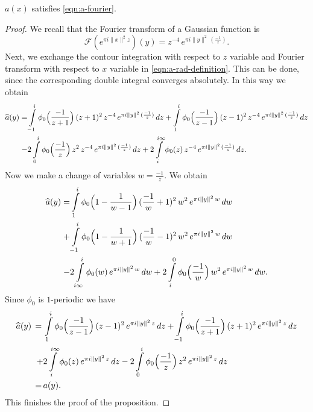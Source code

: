 \begin{proposition}\label{prop:a-fourier}\leanok
$a(x)$ satisfies \eqref{eqn:a-fourier}.
\end{proposition}
\begin{proof}\leanok
We recall that the Fourier transform of a Gaussian function is
\begin{equation}\label{eqn:gaussian Fourier}
    \mathcal{F}(e^{\pi i \|x\|^2 z})(y)=z^{-4}\,e^{\pi i \|y\|^2 \,(\frac{-1}{z}) }.
\end{equation}
Next, we exchange the contour integration with respect to $z$ variable and Fourier transform with respect to $x$ variable in \eqref{eqn:a-rad-definition}.
This can be done, since the corresponding double integral converges absolutely. In this way we obtain
\begin{align}
    \widehat{a}(y)=&\int\limits_{-1}^i\phi_0\Big(\frac{-1}{z+1}\Big)\,(z+1)^2\,z^{-4}\,e^{\pi i \|y\|^2 \,(\frac{-1}{z})}\,dz
    +\int\limits_{1}^i\phi_0\Big(\frac{-1}{z-1}\Big)\,(z-1)^2\,z^{-4}\,e^{\pi i \|y\|^2 \,(\frac{-1}{z})}\,dz\notag \\
    -&2\int\limits_{0}^i\phi_0\Big(\frac{-1}{z}\Big)\,z^2\,z^{-4}\,e^{\pi i \|y\|^2 \,(\frac{-1}{z})}\,dz +2\int\limits_{i}^{i\infty}\phi_0(z)\,z^{-4}\,e^{\pi i \|y\|^2 \,(\frac{-1}{z})}\,dz.\notag
\end{align}
Now we make a change of variables $w=\frac{-1}{z}$. We obtain
\begin{align}
    \widehat{a}(y)=&\int\limits_{1}^i\phi_0\Big(1-\frac{1}{w-1}\Big)\,(\frac{-1}{w}+1)^2\,w^{2}\,e^{\pi i \|y\|^2 \,w}\,dw\notag\\
    +&\int\limits_{-1}^i\phi_0\Big(1-\frac{1}{w+1}\Big)\,(\frac{-1}{w}-1)^2\,w^2\,e^{\pi i \|y\|^2 \,w}\,dw\\
    -&2\int\limits_{i \infty}^i\phi_0(w)\,e^{\pi i \|y\|^2 \,w}\,dw +2\int\limits_{i}^{0}\phi_0\Big(\frac{-1}{w}\Big)\,w^{2}\,e^{\pi i \|y\|^2 \,w}\,dw.\notag
\end{align}
Since $\phi_0$ is $1$-periodic we have
\begin{align}
    \widehat{a}(y)\,=\,&\int\limits_{1}^i\phi_0\Big(\frac{-1}{z-1}\Big)\,(z-1)^2\,e^{\pi i \|y\|^2 \,z}\,dz
    +\int\limits_{-1}^i\phi_0\Big(\frac{-1}{z+1}\Big)\,(z+1)^2\,e^{\pi i \|y\|^2 \,z}\,dz\notag \\
    +&2\int\limits_{i}^{i\infty}\phi_0(z)\,e^{\pi i \|y\|^2 \,z}\,dz
    -2\int\limits_{0}^{i}\phi_0\Big(\frac{-1}{z}\Big)\,z^{2}\,e^{\pi i \|y\|^2 \,z}\,dz\notag \\
    \,=\,&a(y).
\end{align}
This finishes the proof of the proposition.
\end{proof}

